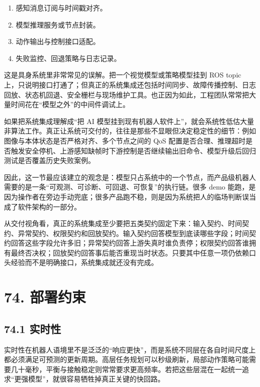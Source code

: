 \begin{enumerate}
\item 感知消息订阅与时间戳对齐。
\item 模型推理服务或节点封装。
\item 动作输出与控制接口适配。
\item 失败监控、回退策略与日志记录。
\end{enumerate}

这是具身系统里非常常见的误解。把一个视觉模型或策略模型挂到 ROS topic 上，只说明接口打通了；但真正的系统集成还包括时间同步、故障传播控制、日志回放、状态机回退、安全栅栏与现场维护工具。也正因为如此，工程团队常常把大量时间花在“模型之外”的中间件调试上。

如果把系统集成理解成“把 AI 模型挂到现有机器人软件上”，就会系统性低估大量非算法工作。真正让系统可交付的，往往是那些不显眼但决定稳定性的细节：例如图像与本体状态是否严格对齐、多个节点之间的 QoS 配置是否合理、推理超时是否触发安全停机、上游感知缺帧时下游控制是否继续输出旧命令、模型升级后回归测试是否覆盖历史失败案例。

因此，这一节最应该建立的观念是：模型只占系统中的一个节点，而产品级机器人需要的是一条“可观测、可诊断、可回退、可恢复”的执行链。很多 demo 能跑，是因为操作者在旁边手动兜底；很多产品跑不稳，则是因为系统把人的临场判断误当成了软件架构的一部分。

从交付视角看，真正的系统集成至少要把五类契约固定下来：输入契约、时间契约、异常契约、权限契约和回放契约。输入契约回答模型到底读哪些字段；时间契约回答这些字段允许多旧；异常契约回答上游失真时谁负责停；权限契约回答谁拥有最终否决权；回放契约回答事后能否重现当时状态。只要其中任意一项仍依赖口头经验而不是明确接口，系统集成就还没有完成。

\section*{74. 部署约束}

\subsection*{74.1 实时性}


实时性在机器人语境里不是泛泛的“响应更快”，而是系统不同层在各自时间尺度上都必须满足可预测的更新周期。高层任务规划可以秒级刷新，局部动作策略可能需要几十毫秒，平衡与接触稳定则常常要求更高频率。若把这些层混在一起统一追求“更强模型”，就很容易牺牲掉真正关键的快回路。

